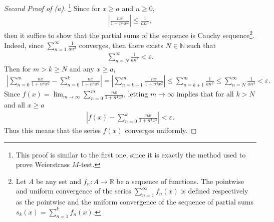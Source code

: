 \documentclass[11pt]{article}
\theoremstyle{definition}
\numberwithin{equation}{subsection}
\begin{document}
\begin{proof}[Second Proof of (a)]\footnote{This proof is similar to the first one, since it is exactly the method used to prove Weierstrass $M$-test.} Since for $x \geq a$ and $n \geq 0$,
\begin{align*}
    \left|\frac{nx}{1 + n^4x^2}\right| \leq \frac{1}{an^3},
\end{align*}
then it suffice to show that the partial sums of the sequence is Cauchy sequence\footnote{Let $A$ be any set and $f_n:A \to \mathbb{R}$ be a sequence of functions. The pointwise and uniform convergence of the series $  \sum^\infty_{n=1}f_n(x)$ is defined respectively as the pointwise and the uniform convergence of the sequence of partial sums $s_k(x) =   \sum^k_{n=1}f_n(x)$.}. Indeed, since $  \sum^\infty_{n=1} \frac{1}{an^3}$ converges, then there exists $N \in \mathbb{N}$ such that 
\begin{align*}
    \sum^\infty_{n=N} \frac{1}{an^3} < \varepsilon.
\end{align*}
Then for $m > k \geq N$ and any $x \geq a$,
\begin{align*}
    \left|\sum^m_{n=0} \frac{nx}{1 + n^4x^2} - \sum^k_{n=0} \frac{nx}{1 + n^4x^2} \right| = \left|\sum^m_{n=k+1} \frac{nx}{1 + n^4x^2}  \right| \leq \sum^m_{n=k+1} \frac{1}{an^3} \leq \sum^\infty_{n=N} \frac{1}{an^3} < \varepsilon.
\end{align*}
Since $  f(x) = \lim_{m\to\infty}\sum^m_{n=0} \frac{nx}{1 + n^4x^2}$, letting $m \to \infty$ implies that for all $k > N$ and all $x \geq a$
\begin{align*}
    \left|f(x) - \sum^k_{n=0} \frac{nx}{1 + n^4x^2} \right| < \varepsilon.
\end{align*}
Thus this means that the series $f(x)$ converges uniformly.
\end{proof}

\medskip
\end{document}

